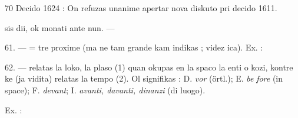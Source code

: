 \begin{VUpage}[74]{70}
{Decido 1624 : On refuzas unanime apertar nova diskuto pri\nl
decido 1611.%
}

\VUcontinue
sis dii, ok monati ante nun. --- \nl
{}\nl
{}

\VUblanc{5.55pt}%
61. ---  = tre proxime (ma ne tam grande kam\nl
indikas ; videz ica). Ex. : \nl
{}\nl
{}\nl
{}

\VUblanc{5.97pt}%
62. ---  relatas la loko, la plaso (1) quan okupas\nl
en la spaco la enti o kozi, kontre ke  (ja vidita)\nl
relatas la tempo (2). Ol signifikas : D. \textit{vor} (örtl.); E. \textit{be}\cc
\textit{fore} (in space); F. \textit{devant}; I. \textit{avanti, davanti, dinanzi} (di\nl
luogo).

Ex. : \parplein
\end{VUpage}

